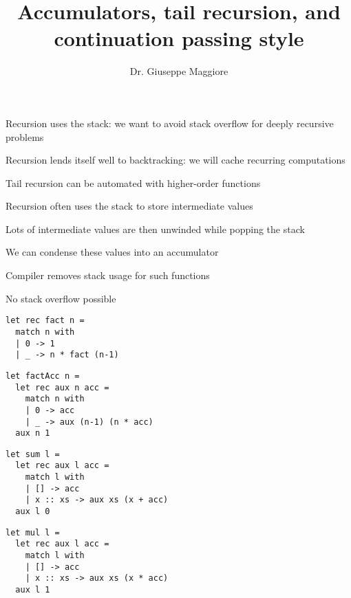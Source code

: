 \documentclass{beamer}
\title{Accumulators, tail recursion, and continuation passing style}
\author{Dr. Giuseppe Maggiore}
\institute{Hogeschool Rotterdam \\ 
Rotterdam, Netherlands}
\date{}
\begin{document}
\maketitle

\begin{slide}{
\item Recursion uses the stack: we want to avoid stack overflow for deeply recursive problems
\item Recursion lends itself well to backtracking: we will cache recurring computations
\item Tail recursion can be automated with higher-order functions
}\end{slide}

\begin{slide}{
\item Recursion often uses the stack to store intermediate values
\item Lots of intermediate values are then unwinded while popping the stack
\item We can condense these values into an accumulator
\item Compiler removes stack usage for such functions
\item No stack overflow possible
}\end{slide}

\begin{frame}[fragile]
\begin{lstlisting}
let rec fact n = 
  match n with
  | 0 -> 1
  | _ -> n * fact (n-1)
\end{lstlisting}
\end{frame}

\begin{frame}[fragile]
\begin{lstlisting}
let factAcc n = 
  let rec aux n acc = 
    match n with
    | 0 -> acc
    | _ -> aux (n-1) (n * acc)
  aux n 1
\end{lstlisting}
\end{frame}

\begin{frame}[fragile]
\begin{lstlisting}
let sum l = 
  let rec aux l acc = 
    match l with
    | [] -> acc
    | x :: xs -> aux xs (x + acc)
  aux l 0
\end{lstlisting}
\end{frame}

\begin{frame}[fragile]
\begin{lstlisting}
let mul l = 
  let rec aux l acc = 
    match l with
    | [] -> acc
    | x :: xs -> aux xs (x * acc)
  aux l 1
\end{lstlisting}
\end{frame}
\end{document}
